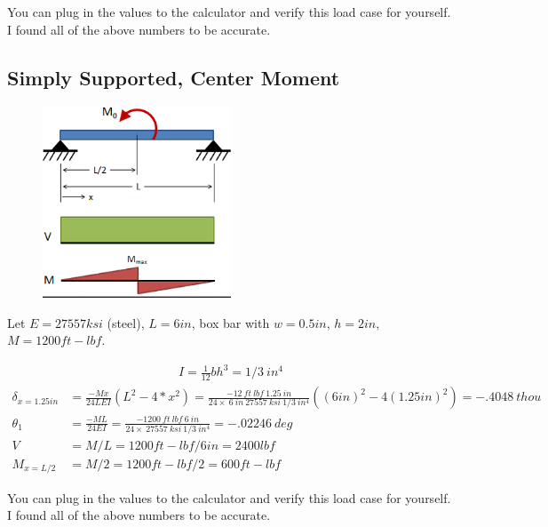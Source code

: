 \documentclass[10pt,letterpaper]{article}
\begin{document}
	You can plug in the values to the calculator and verify this load case for yourself. I found all of the above numbers to be accurate.

	\newpage
	\subsection{Simply Supported, Center Moment}

	\begin{figure}[H]
		\includegraphics[width=0.5\textwidth]{beam_case2_schematic.png}
	\end{figure}

	Let $E = 27557 ksi$ (steel), $L = 6 in$, box bar with $w = 0.5 in$, $h = 2in$, $M = 1200 ft-lbf$.

	\begin{align}
		I = \frac{1}{12} b h^3 = 1/3 \ in^4
	\end{align}
	\begin{align}
		\delta_{x = 1.25 in} &= \frac{ - M x}{24 L E I}(L^2 - 4*x^2) = \frac{-12\ ft\ lbf\ 1.25 \ in}{24 \times \ 6 \ in \ 27557 \ ksi \ 1/3 \ in^4} ((6 in)^2 - 4 (1.25 in)^2) = -.4048 \ thou \\
		\theta_{1} &= \frac{- M L}{24 E I} = \frac{-1200\ ft\ lbf\ 6 \ in}{24 \times \ 27557 \ ksi \ 1/3 \ in^4} = -.02246 \ deg \\
		V &= M / L = 1200 ft-lbf / 6 in = 2400 lbf \\
		M_{x=L/2} &= M / 2 = 1200 ft-lbf / 2 = 600 ft-lbf
	\end{align}

	You can plug in the values to the calculator and verify this load case for yourself. I found all of the above numbers to be accurate.
\end{document}
